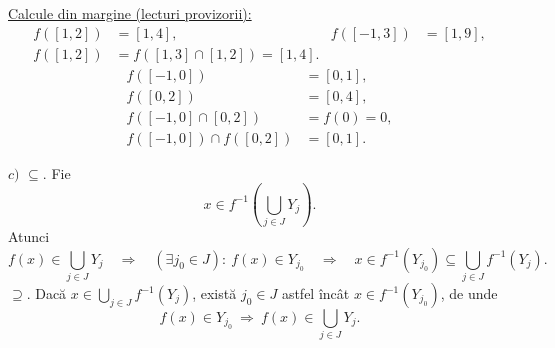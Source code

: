 \begin{center}
\end{center}

\noindent\underline{Calcule din margine (lecturi provizorii):}
\[
\begin{aligned}
 f([1,2])&=[1,4], & f([-1,3])&=[1,9],\\
 f([1,2])&=f([1,3]\cap[1,2])=[1,4].
\end{aligned}
\]
\[
\boxed{\begin{aligned}
 f([-1,0])&=[0,1],\\
 f([0,2])&=[0,4],\\
 f([-1,0]\cap[0,2])&=f(0)=0,\\
 f([-1,0])\cap f([0,2])&=[0,1].
\end{aligned}}
\]

\medskip
\noindent $c)$ \underline{$\subseteq$}.
Fie
\[
 x\in f^{-1}\left(\bigcup_{j\in J}Y_j\right).
\]
\noindent Atunci
\[
 f(x)\in\bigcup_{j\in J}Y_j
 \quad\Longrightarrow\quad
 (\exists j_0\in J):\ f(x)\in Y_{j_0}
 \quad\Longrightarrow\quad
 x\in f^{-1}(Y_{j_0})
 \subseteq\bigcup_{j\in J}f^{-1}(Y_j).
\]
\noindent \underline{$\supseteq$}.
Dacă $x\in\bigcup_{j\in J}f^{-1}(Y_j)$, există $j_0\in J$
astfel încât $x\in f^{-1}(Y_{j_0})$, de unde
\[
 f(x)\in Y_{j_0}\ \Longrightarrow\ f(x)\in\bigcup_{j\in J}Y_j.
\]
